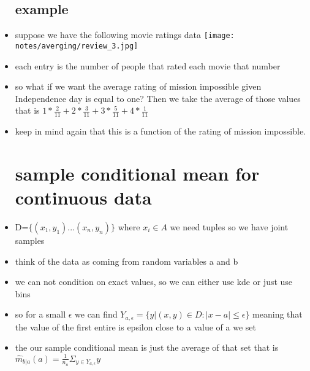 \documentclass{article}
\begin{document}
\begin{itemize}
\subsection{example}
\item suppose we have the following movie ratings data \texttt{[image: notes/averging/review\_3.jpg]} 
\item each entry is the number of people that rated each movie that number 
\item so what if we want the average rating of mission impossible given Independence day is equal to one? Then we take the average of those values that is $1*\frac{2}{11}+2*\frac{3}{11}+3*\frac{5}{11}+4*\frac{1}{11}$
\item keep in mind again that this is a function of the rating of mission impossible. 
 \section{sample conditional mean for continuous data}
 \item D=$\{(x_1,y_1)...(x_n,y_n)\}$ where $x_i\in A$ we need tuples so we have joint samples
 \item think of the data as coming from random variables a and b 
 \item we can not condition on exact values, so we can either use kde or just use bins 
 \item so for a small $\epsilon$ we can find $Y_{a, \epsilon}=\{y|(x,y)\in D : |x-a|\leq \epsilon \}$ meaning that the value of the first entire is epsilon close to a value of a we set 
 \item the our sample conditional mean is just the average of that set that is $\hat{m}_{b|a}(a)=\frac{1}{n_a}\Sigma_{y\in Y_{a,\epsilon}}y$

\end{itemize}
\end{document}
